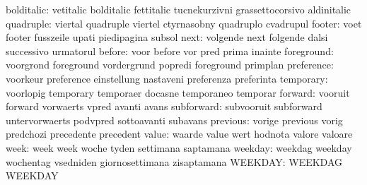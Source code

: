               bolditalic: vetitalic                 bolditalic
                           fettitalic                tucnekurzivni
                           grassettocorsivo          aldinitalic
                quadruple: viertal                   quadruple
                           viertel                   ctyrnasobny
                           quadruplo                 cvadrupul
                   footer: voet                      footer
                           fusszeile                 upati
                           piedipagina               subsol
                     next: volgende                  next
                           folgende                  dalsi
                           successivo                urmatorul
                   before: voor                      before
                           vor                       pred
                           prima                     inainte
               foreground: voorgrond                 foreground
                           vordergrund               popredi
                           foreground                primplan
               preference: voorkeur                  preference
                           einstellung               nastaveni
                           preferenza                preferinta
                temporary: voorlopig                 temporary
                           temporaer                 docasne
                           temporaneo                temporar
                  forward: vooruit                   forward
                           vorwaerts                 vpred
                           avanti                    avans
               subforward: subvooruit                subforward
                           untervorwaerts            podvpred
                           sottoavanti               subavans
                 previous: vorige                    previous
                           vorig                     predchozi
                           precedente                precedent
                    value: waarde                    value
                           wert                      hodnota
                           valore                    valoare
                     week: week                      week
                           woche                     tyden
                           settimana                 saptamana
                  weekday: weekdag                   weekday
                           wochentag                 vsedniden
                           giornosettimana           zisaptamana
                  WEEKDAY: WEEKDAG                   WEEKDAY
